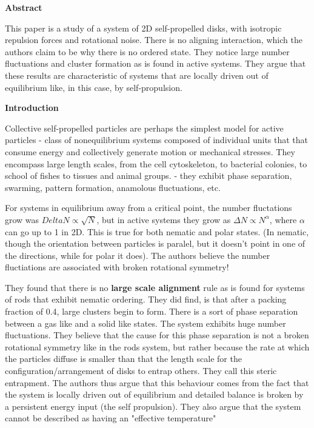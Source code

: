\documentclass[a4paper]{article}
\begin{document}
\textbf{Abstract}

This paper is a study of a system of 2D self-propelled disks, with isotropic repulsion forces and rotational noise. There is no aligning interaction, which the authors claim to be why there is no ordered state. They notice large number fluctuations and cluster formation as is found in active systems. They argue that these results are characteristic of systems that are locally driven out of equilibrium like, in this case, by self-propulsion.

\textbf{Introduction}

Collective self-propelled particles are perhaps the simplest model for active particles - class of nonequilibrium systems composed of individual units that that consume energy and collectively generate motion or mechanical stresses. They encompass large length scales, from the cell cytoskeleton, to bacterial colonies, to school of fishes to tissues and animal groups. - they exhibit phase separation, swarming, pattern formation, anamolous fluctuations, etc.

For systems in equilibrium away from a critical point, the number fluctations grow was $Delta N \propto \sqrt{N}$, but in active systems they grow as $\Delta N \propto N^\alpha $, where $\alpha$ can go up to 1 in 2D. This is true for both nematic and polar states. (In nematic, though the orientation between particles is paralel, but it doesn't point in one of the directions, while for polar it does). The authors believe the number fluctiations are associated with broken rotational symmetry!

They found that there is no \textbf{large scale alignment} rule as is found for systems of rods that exhibit nematic ordering.  They did find, is that after a packing fraction of 0.4, large clusters begin to form. There is a sort of phase separation between a gas like and a solid like states. The system exhibits huge number fluctuations. They believe that the cause for this phase separation is not a broken rotational symmetry like in the rods system, but rather because the rate at which the particles diffuse is smaller than that the length scale for the configuration/arrangement of disks to entrap others. They call this steric entrapment. The authors thus argue that this behaviour comes from the fact that the system is locally driven out of equilibrium and detailed balance is broken by a persistent energy input (the self propulsion). They also argue that the system cannot be described as having an "effective temperature"
\end{document}
